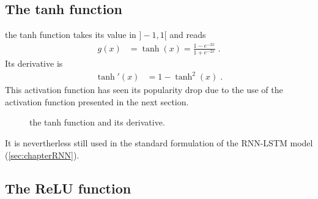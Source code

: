 \subsection{The tanh function}

the tanh function takes its value in $]-1,1[$ and reads
\begin{align}
g(x)&=\tanh(x)=\frac{1-e^{-2x}}{1+e^{-2x}}\;.
\end{align}
Its derivative is
\begin{align}
\tanh'(x)&=1-\tanh^2(x)\;.
\end{align}
This activation function has seen its popularity drop due to the use of the activation function presented in the next section.

\begin{figure}[H]
\begin{center}
\end{center}
\caption{\label{fig:tanh} the tanh function and its derivative.}
\end{figure}

It is nevertherless still used in the standard formulation of the RNN-LSTM model (\ref{sec:chapterRNN}).

\subsection{The ReLU function}


